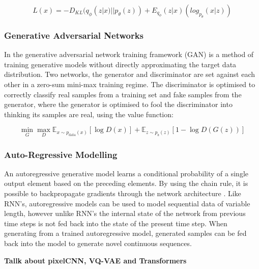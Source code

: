 \begin{equation}
\label{eq:vae}
L(x) = -D_{KL}(q_{\phi}(z|x)||p_{\theta}(z)) + E_{q_\phi}(z|x)(log_{p_{\theta}}(x|z))
\end{equation}

\subsubsection{Generative Adversarial Networks}

In the generative adversarial network training framework (GAN) \cite{goodfellow2014generative} is a method of training generative models without directly approximating the target data distribution. 
Two networks, the generator and discriminator are set against each other in a zero-sum mini-max training regime. 
The discriminator is optimised to correctly classify real samples from a training set and fake samples from the generator, where the generator is optimised to fool the discriminator into thinking its samples are real, using the value function: 

\begin{equation}
\label{eq:gan}
\min_{G}\max_{D}\mathbb{E}_{x\sim p_{\text{data}}(x)}[\log{D(x)}] + \mathbb{E}_{z\sim p_{\text{z}}(z)}[1 - \log{D(G(z))}]
\end{equation}

\subsubsection{Auto-Regressive Modelling}

An autoregressive generative model learns a conditional probability of a single output element based on the preceding elements. 
By using the chain rule, it is possible to backpropagate gradients through the network architecture \cite{larochelle2011neural}. 
Like RNN's, autoregressive models can be used to model sequential data of variable length, however unlike RNN's the internal state of the network from previous time steps is not fed back into the state of the present time step. 
When generating from a trained autoregressive model, generated samples can be fed back into the model to generate novel continuous sequences.

\textbf{Tallk about pixelCNN, VQ-VAE and Transformers}


